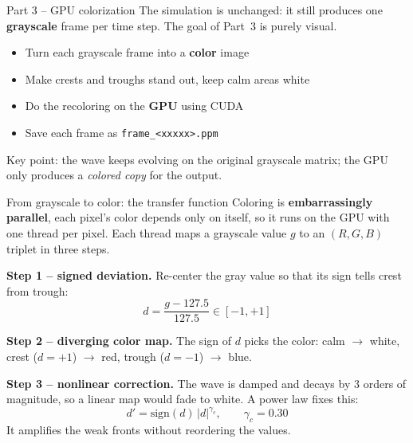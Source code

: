 \documentclass[11pt,aspectratio=169]{beamer}
\begin{document}
  \begin{frame}{Part 3 -- GPU colorization}
  The simulation is unchanged: it still produces one \textbf{grayscale}
  frame per time step. The goal of Part~3 is purely visual.
  \begin{itemize}
    \item Turn each grayscale frame into a \textbf{color} image
    \item Make crests and troughs stand out, keep calm areas white
    \item Do the recoloring on the \textbf{GPU} using CUDA
    \item Save each frame as \texttt{frame\_<xxxxx>.ppm} 
  \end{itemize}
  \vspace{0.2cm}
  Key point: the wave keeps evolving on the original grayscale matrix;
  the GPU only produces a \emph{colored copy} for the output.
\end{frame}

\begin{frame}{From grayscale to color: the transfer function}
  Coloring is \textbf{embarrassingly parallel}, each pixel's color
  depends only on itself, so it runs on the GPU with one thread per
  pixel. Each thread maps a grayscale value $g$ to an $(R,G,B)$ triplet
  in three steps.
  \vspace{0.3cm}

  \textbf{Step 1 -- signed deviation.} Re-center the gray value so that
  its sign tells crest from trough:
  \[
    d = \frac{g-127.5}{127.5} \in [-1,+1]
  \]

  \textbf{Step 2 -- diverging color map.} The sign of $d$ picks the color:
  calm $\to$ white, crest ($d{=}{+}1$) $\to$ red, trough ($d{=}{-}1$)
  $\to$ blue.

  \textbf{Step 3 -- nonlinear correction.} The wave is damped and decays
  by 3 orders of magnitude, so a linear map would fade to white. A power
  law fixes this:
  \[
    d' = \text{sign}(d)\,|d|^{\gamma_c}, \qquad \gamma_c = 0.30
  \]
  It amplifies the weak fronts without reordering the values.
\end{frame}
\end{document}
